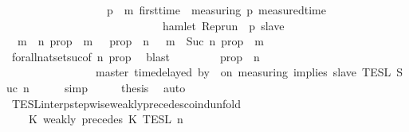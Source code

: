 \begin{isabellebody}
\ \ \ \ \ \ \ \ \ \ \ \ \ \ \ \ \ \ {\isasymforall}p\ {\isasymge}\ m{\isachardot}\ first{\isacharunderscore}time\ {\isasymrho}\ measuring\ p\ {\isacharparenleft}measured{\isacharunderscore}time\ {\isacharplus}\ {\isasymdelta}{\isasymtau}{\isacharparenright}\isanewline
\ \ \ \ \ \ \ \ \ \ \ \ \ \ \ \ \ \ \ \ \ \ \ \ \ \ \ {\isasymlongrightarrow}\ hamlet\ {\isacharparenleft}{\isacharparenleft}Rep{\isacharunderscore}run\ {\isasymrho}{\isacharparenright}\ p\ slave{\isacharparenright}{\isacharparenright}{\isacartoucheclose}\isanewline
\ \ \isamarkupfalse%
\ {\isacartoucheopen}{\isacharbraceleft}{\isasymrho}{\isachardot}\ {\isasymforall}m\ {\isasymge}\ n{\isachardot}\ {\isacharquery}prop\ {\isasymrho}\ m{\isacharbraceright}\ {\isacharequal}\ {\isacharbraceleft}{\isasymrho}{\isachardot}\ {\isacharquery}prop\ {\isasymrho}\ n{\isacharbraceright}\ {\isasyminter}\ {\isacharbraceleft}{\isasymrho}{\isachardot}\ {\isasymforall}m\ {\isasymge}\ Suc\ n{\isachardot}\ {\isacharquery}prop\ {\isasymrho}\ m{\isacharbraceright}{\isacartoucheclose}\isanewline
\ \ \ \ \isamarkupfalse%
\ forall{\isacharunderscore}nat{\isacharunderscore}set{\isacharunderscore}suc{\isacharbrackleft}of\ {\isacartoucheopen}n{\isacartoucheclose}\ {\isacharquery}prop{\isacharbrackright}\ \isamarkupfalse%
\ blast\isanewline
\ \ \isamarkupfalse%
\ \isamarkupfalse%
\ {\isacartoucheopen}{\isachardot}{\isachardot}{\isachardot}\ {\isacharequal}\ {\isacharbraceleft}{\isasymrho}{\isachardot}\ {\isacharquery}prop\ {\isasymrho}\ n{\isacharbraceright}\isanewline
\ \ \ \ \ \ \ \ \ \ \ \ \ \ {\isasyminter}\ {\isasymlbrakk}\ master\ time{\isacharminus}delayed\ by\ {\isasymdelta}{\isasymtau}\ on\ measuring\ implies\ slave\ {\isasymrbrakk}\isactrlsub T\isactrlsub E\isactrlsub S\isactrlsub L\isactrlbsup {\isasymge}\ Suc\ n\isactrlesup {\isacartoucheclose}\isanewline
\ \ \ \ \isamarkupfalse%
\ simp\isanewline
\ \ \isamarkupfalse%
\ \isamarkupfalse%
\ {\isacharquery}thesis\ \isamarkupfalse%
\ auto\isanewline
{}\isamarkupfalse%
%
\endisatagproof
{\isafoldproof}%
%
\isadelimproof
\isanewline
%
\endisadelimproof
\isanewline
{}\isamarkupfalse%
\ TESL{\isacharunderscore}interp{\isacharunderscore}stepwise{\isacharunderscore}weakly{\isacharunderscore}precedes{\isacharunderscore}coind{\isacharunderscore}unfold{\isacharcolon}\isanewline
\ \ \ {\isacartoucheopen}{\isasymlbrakk}\ K\ weakly\ precedes\ K\ {\isasymrbrakk}\isactrlsub T\isactrlsub E\isactrlsub S\isactrlsub L\isactrlbsup {\isasymge}\ n\isactrlesup \ {\isacharequal}\ \ \ \ \ \ \ \ \ \ \ \ \ \ \ \ \ %

\end{isabellebody}
